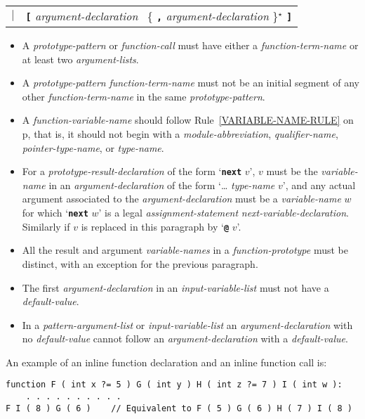 \documentclass[12pt]{article}
\newcommand{\TT}[1]{{\tt \bfseries #1}}
\newcommand{\STAR}{{\Large $^\star$}}
\newcommand{\pagref}[1]{p\pageref{#1}}
\newenvironment{indpar}[1][0.3in]%
	{\begin{list}{}%
		     {\setlength{\itemsep}{0in}%
		      \setlength{\topsep}{0in}%
		      \setlength{\parsep}{1ex}%
		      \setlength{\labelwidth}{#1}%
		      \setlength{\leftmargin}{#1}%
		      \addtolength{\leftmargin}{\labelsep}}%
	 \item}%
	{\end{list}}
\begin{document}
\begin{indpar}
\begin{tabular}[t]{@{}rl}
    $|$ & \TT{[} {\em argument-declaration}~
                 \{ \TT{,} {\em argument-declaration} \}\STAR{} \TT{]} \\
    \end{tabular}
\begin{itemize}
\item
A {\em prototype-pattern} or {\em function-call}
must have either a {\em function-term-name}
or at least two {\em argu\-ment-lists}.
\item
A {\em prototype-pattern} {\em function-term-name} must not be
an initial segment of any other {\em function-term-name}
in the same {\em prototype-pattern}.
\item
A {\em function-variable-name} should follow Rule~\ref{VARIABLE-NAME-RULE}
on \pagref{VARIABLE-NAME-RULE}, that is, it
should not begin with a {\em module-abbreviation},
{\em qualifier-name}, {\em pointer-type-name}, or {\em type-name}.
\item
For a {\em prototype-result-declaration} of the form `\TT{next} $v$',
$v$ must be the {\em vari\-able-name} in an {\em argument-declaration}
of the form `\dots{} {\em type-name} $v$', and
any actual argument associated to the {\em argument-declaration}
must be a {\em variable-name} $w$ for which `\TT{next} $w$' is a legal
{\em assignment-statement} {\em next-variable-declaration}.
Similarly if $v$ is replaced in this paragraph by `\TT{@} $v$'.
\item
All the result and argument {\em variable-names}
in a {\em function-prototype} must
be distinct, with an exception for the previous paragraph.
\item
The first {\em argument-declaration} in an {\em input-variable-list}
must not have a {\em default-value}.
\item
In a {\em pattern-argument-list} or {\em input-variable-list}
an {\em argument-declaration} with no {\em de\-fault-value} cannot
follow an {\em argument-declaration} with a {\em default-value}.

\end{itemize}
\end{indpar}

An example of an inline function declaration and an inline function call is:
\begin{indpar}\begin{verbatim}
function F ( int x ?= 5 ) G ( int y ) H ( int z ?= 7 ) I ( int w ):
    . . . . . . . . . .
F I ( 8 ) G ( 6 )    // Equivalent to F ( 5 ) G ( 6 ) H ( 7 ) I ( 8 )
\end{verbatim}\end{indpar}
\end{document}
